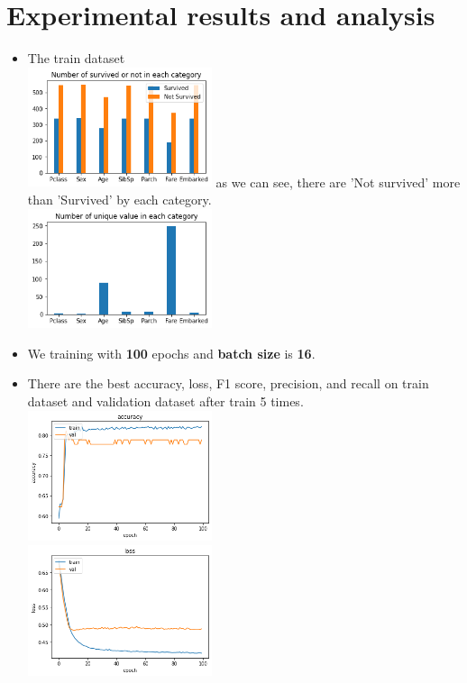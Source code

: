\documentclass{article}
\begin{document}
\section{Experimental results and analysis}
\begin{itemize}
    \item The train dataset 
        \\
        \includegraphics[width=0.425\textwidth]{chart_sur_or_not.png}
        as we can see, there are 'Not survived' more than 'Survived' by each category.
        \\
        \includegraphics[width=0.425\textwidth]{chart_unique.png}   
    \item We training with \textbf{100} epochs and \textbf{batch size} is \textbf{16}.
    \item There are the best accuracy, loss, F1 score, precision, and recall on train dataset and validation dataset after train 5 times.
    \\
    \includegraphics[width=0.425\textwidth]{accuracy.png}
    \\
    \includegraphics[width=0.425\textwidth]{loss.png}

\end{itemize}
\end{document}
